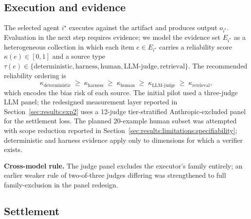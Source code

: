 \subsection{Execution and evidence}
\label{sec:protocol:execute}

The selected agent $i^\star$ executes against the artifact and produces output $o_{i^\star}$. Evaluation in the next step requires evidence; we model the evidence set $E_{i^\star}$ as a heterogeneous collection in which each item $e \in E_{i^\star}$ carries a reliability score $\kappa(e) \in [0, 1]$ and a source type $\tau(e) \in \{\text{deterministic}, \text{harness}, \text{human}, \text{LLM-judge}, \text{retrieval}\}$. The recommended reliability ordering is
\begin{equation}
\kappa_{\text{deterministic}} \;\geq\; \kappa_{\text{harness}} \;\geq\; \kappa_{\text{human}} \;\geq\; \kappa_{\text{LLM-judge}} \;\geq\; \kappa_{\text{retrieval}},
\label{eq:kappa}
\end{equation}
which encodes the bias risk of each source. The initial pilot used a three-judge LLM panel; the redesigned measurement layer reported in Section~\ref{sec:results:exp2} uses a 12-judge tier-stratified Anthropic-excluded panel for the settlement loss. The planned 20-example human subset was attempted with scope reduction reported in Section~\ref{sec:results:limitations:specifiability}; deterministic and harness evidence apply only to dimensions for which a verifier exists.

\textbf{Cross-model rule.} The judge panel excludes the executor's family entirely; an earlier weaker rule of two-of-three judges differing was strengthened to full family-exclusion in the panel redesign.

\subsection{Settlement}
\label{sec:protocol:settlement}

